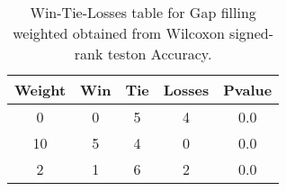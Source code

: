\begin{table}[H]
\centering
\begin{tabular}{|c|c|c|c|c|}

\textbf{Weight} &  \textbf{Win} &  \textbf{Tie} &  \textbf{Losses} &  \textbf{Pvalue} \\
\hline

              0 &             0 &             5 &                4 &              0.0 \\
\hline
             10 &             5 &             4 &                0 &              0.0 \\
\hline
              2 &             1 &             6 &                2 &              0.0 \\
\hline

\end{tabular}
\caption{Win-Tie-Losses table for Gap filling weighted obtained from Wilcoxon signed-rank teston Accuracy.}
\label{tab:gap_filling_weighted_weighted_cae_comparison}
\end{table}